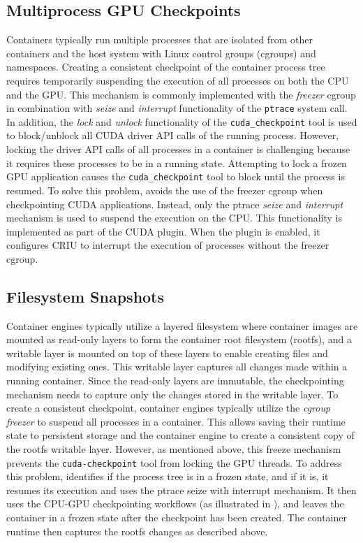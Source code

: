 \subsection{Multiprocess GPU Checkpoints}
Containers typically run multiple processes that are isolated from other containers and the host system with Linux control groups (cgroups) and namespaces. Creating a consistent checkpoint of the container process tree requires temporarily suspending the execution of all processes on both the CPU and the GPU. This mechanism is commonly implemented with the \textit{freezer} cgroup in combination with \textit{seize} and \textit{interrupt} functionality of the \texttt{ptrace} system call. In addition, the \textit{lock} and \textit{unlock} functionality of the \texttt{cuda\_checkpoint} tool is used to block/unblock all CUDA driver API calls of the running process. However, locking the driver API calls of all processes in a container is challenging because it requires these processes to be in a running state. Attempting to lock a frozen GPU application causes the \texttt{cuda\_checkpoint} tool to block until the process is resumed. To solve this problem, \sys avoids the use of the freezer cgroup when checkpointing CUDA applications. Instead, only the ptrace \textit{seize} and \textit{interrupt} mechanism is used to suspend the execution on the CPU. This functionality is implemented as part of the CUDA plugin. When the plugin is enabled, it configures CRIU to interrupt the execution of processes without the freezer cgroup.

\subsection{Filesystem Snapshots}
Container engines typically utilize a layered filesystem where container images are mounted as read-only layers to form the container root filesystem (rootfs), and a writable layer is mounted on top of these layers to enable creating files and modifying existing ones. This writable layer captures all changes made within a running container. Since the read-only layers are immutable, the checkpointing mechanism needs to capture only the changes stored in the writable layer. To create a consistent checkpoint, container engines typically utilize the \textit{cgroup freezer} to suspend all processes in a container. This allows saving their runtime state to persistent storage and the container engine to create a consistent copy of the rootfs writable layer. However, as mentioned above, this freeze mechanism prevents the \texttt{cuda-checkpoint} tool from locking the GPU threads. To address this problem, \sys identifies if the process tree is in a frozen state, and if it is, it resumes its execution and uses the ptrace seize with interrupt mechanism. It then uses the CPU-GPU checkpointing workflows (as illustrated in ), and leaves the container in a frozen state after the checkpoint has been created. The container runtime then captures the rootfs changes as described above.

